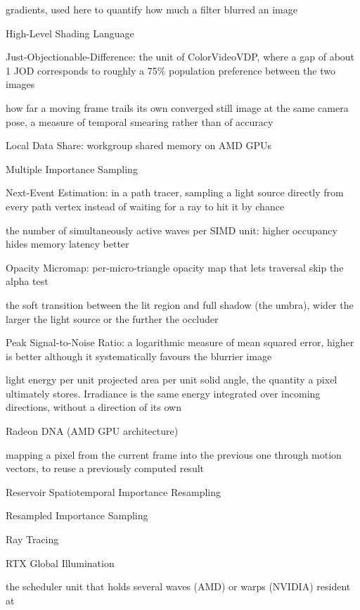 \begin{description}
    gradients, used here to quantify how much a filter blurred an image
  \item[HLSL] High-Level Shading Language
  \item[JOD] Just-Objectionable-Difference: the unit of ColorVideoVDP, where a gap of about 1 JOD
    corresponds to roughly a 75\% population preference between the two images
  \item[lag] how far a moving frame trails its own converged still image at the same camera pose, a
    measure of temporal smearing rather than of accuracy
  \item[LDS] Local Data Share: workgroup shared memory on AMD GPUs
  \item[MIS] Multiple Importance Sampling
  \item[NEE] Next-Event Estimation: in a path tracer, sampling a light source directly from every
    path vertex instead of waiting for a ray to hit it by chance
  \item[occupancy] the number of simultaneously active waves per SIMD unit: higher occupancy hides
    memory latency better
  \item[OMM] Opacity Micromap: per-micro-triangle opacity map that lets traversal skip the alpha
    test
  \item[penumbra] the soft transition between the lit region and full shadow (the umbra), wider the
    larger the light source or the further the occluder
  \item[PSNR] Peak Signal-to-Noise Ratio: a logarithmic measure of mean squared error, higher is
    better although it systematically favours the blurrier image
  \item[radiance] light energy per unit projected area per unit solid angle, the quantity a pixel
    ultimately stores. Irradiance is the same energy integrated over incoming directions, without a
    direction of its own
  \item[RDNA] Radeon DNA (AMD GPU architecture)
  \item[reprojection] mapping a pixel from the current frame into the previous one through motion
    vectors, to reuse a previously computed result
  \item[ReSTIR] Reservoir Spatiotemporal Importance Resampling
  \item[RIS] Resampled Importance Sampling
  \item[RT] Ray Tracing
  \item[RTXGI] RTX Global Illumination
  \item[SIMD / SM] the scheduler unit that holds several waves (AMD) or warps (NVIDIA) resident at

\end{description}
